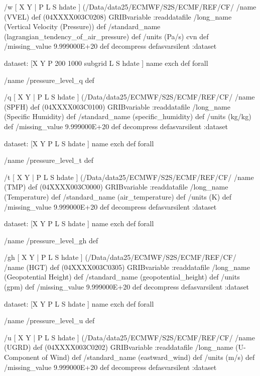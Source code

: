 \begin{ingrid}
{/w { [ X Y | P L S hdate ] (/Data/data25/ECMWF/S2S/ECMF/REF/CF/%
/name (VVEL) def
(04XXXX003C0208) GRIBvariable
:readdatafile
/long_name (Vertical Velocity (Pressure)) def
/standard_name (lagrangian_tendency_of_air_pressure) def
/units (Pa/s) cvn def
/missing_value 9.999000E+20 def
decompress
} defasvarsilent
:dataset

dataset:
[X Y 
P  200 1000 subgrid
L S hdate ] {name exch def } forall

/name /pressure_level_q def

/q { [ X Y | P L S hdate ] (/Data/data25/ECMWF/S2S/ECMF/REF/CF/%
/name (SPFH) def
(04XXXX003C0100) GRIBvariable
:readdatafile
/long_name (Specific Humidity) def
/standard_name (specific_humidity) def
/units (kg/kg) def
/missing_value 9.999000E+20 def
decompress
} defasvarsilent
:dataset

dataset:
[X Y P L S hdate ] {name exch def } forall

/name /pressure_level_t def

/t { [ X Y | P L S hdate ] (/Data/data25/ECMWF/S2S/ECMF/REF/CF/%
/name (TMP) def
(04XXXX003C0000) GRIBvariable
:readdatafile
/long_name (Temperature) def
/standard_name (air_temperature) def
/units (K) def
/missing_value 9.999000E+20 def
decompress
} defasvarsilent
:dataset

dataset:
[X Y P L S hdate ] {name exch def } forall

/name /pressure_level_gh def

/gh { [ X Y | P L S hdate ] (/Data/data25/ECMWF/S2S/ECMF/REF/CF/%
/name (HGT) def
(04XXXX003C0305) GRIBvariable
:readdatafile
/long_name (Geopotential Height) def
/standard_name (geopotential_height) def
/units (gpm) def
/missing_value 9.999000E+20 def
decompress
} defasvarsilent
:dataset

dataset:
[X Y P L S hdate ] {name exch def } forall

/name /pressure_level_u def

/u { [ X Y | P L S hdate ] (/Data/data25/ECMWF/S2S/ECMF/REF/CF/%
/name (UGRD) def
(04XXXX003C0202) GRIBvariable
:readdatafile
/long_name (U-Component of Wind) def
/standard_name (eastward_wind) def
/units (m/s) def
/missing_value 9.999000E+20 def
decompress
} defasvarsilent
:dataset

}
\end{ingrid}
